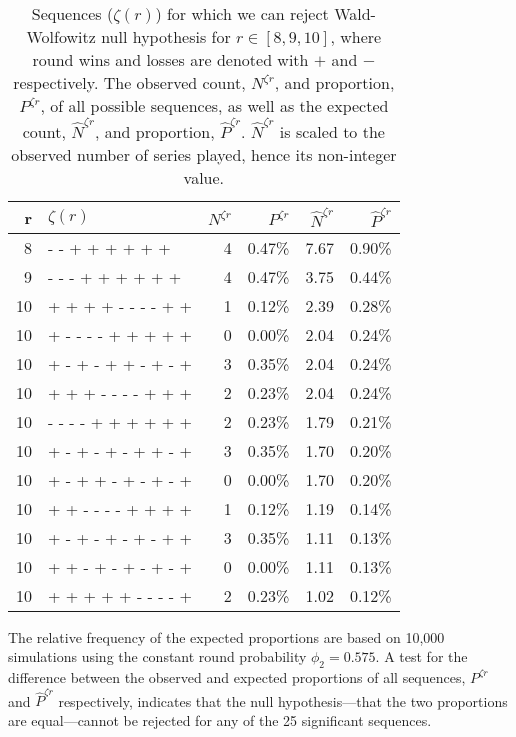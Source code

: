 \documentclass{article}
\begin{document}
\begin{longtable}{rlrrrr}

\caption{Sequences ($\zeta(r)$) for which we can reject Wald-Wolfowitz null hypothesis for $r \in [8, 9, 10]$, where round wins and losses are denoted with $+$ and $-$ respectively. The observed count, $N^{\zeta r}$, and proportion, $P^{\zeta r}$, of all possible sequences, as well as the expected count, $\hat{N}^{\zeta r}$, and proportion, $\hat{P}^{\zeta r}$. $\hat{N}^{\zeta r}$ is scaled to the observed number of series played, hence its non-integer value.}
\label{tbl:cod-runs} \\

\toprule
r & $\zeta(r)$ & $N^{\zeta r}$ & $P^{\zeta r}$ & $\hat{N}^{\zeta r}$ & $\hat{P}^{\zeta r}$ \\ 
\midrule
8 & - - + + + + + + & 4 & 0.47\% & 7.67 & 0.90\% \\ 
9 & - - - + + + + + + & 4 & 0.47\% & 3.75 & 0.44\% \\ 
10 & + + + + - - - - + + & 1 & 0.12\% & 2.39 & 0.28\% \\ 
10 & + - - - - + + + + + & 0 & 0.00\% & 2.04 & 0.24\% \\ 
10 & + - + - + + - + - + & 3 & 0.35\% & 2.04 & 0.24\% \\ 
10 & + + + - - - - + + + & 2 & 0.23\% & 2.04 & 0.24\% \\ 
10 & - - - - + + + + + + & 2 & 0.23\% & 1.79 & 0.21\% \\ 
10 & + - + - + - + + - + & 3 & 0.35\% & 1.70 & 0.20\% \\ 
10 & + - + + - + - + - + & 0 & 0.00\% & 1.70 & 0.20\% \\ 
10 & + + - - - - + + + + & 1 & 0.12\% & 1.19 & 0.14\% \\ 
10 & + - + - + - + - + + & 3 & 0.35\% & 1.11 & 0.13\% \\ 
10 & + + - + - + - + - + & 0 & 0.00\% & 1.11 & 0.13\% \\ 
10 & + + + + + - - - - + & 2 & 0.23\% & 1.02 & 0.12\% \\ 
\bottomrule
\end{longtable}

The relative frequency of the expected proportions are based on 10,000
simulations using the constant round probability \(\phi_2 = 0.575\). A
test for the difference between the observed and expected proportions of
all sequences, \(P^{\zeta r}\) and \(\hat{P}^{\zeta r}\) respectively,
indicates that the null hypothesis---that the two proportions are
equal---cannot be rejected for any of the 25 significant sequences.
\end{document}
